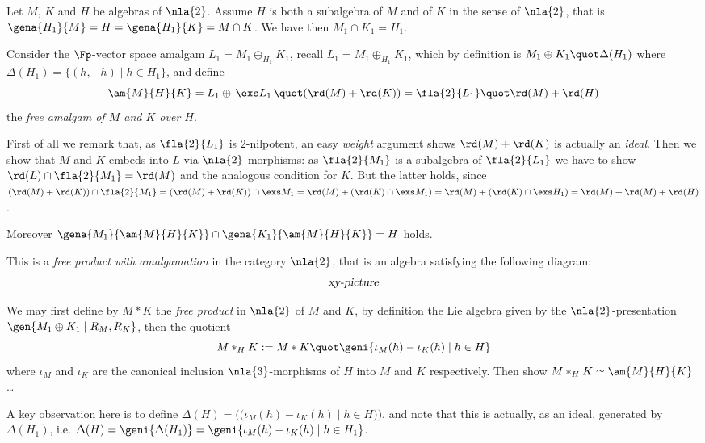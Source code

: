 Let $M$, $K$ and $H$ be algebras of $\nla{2}$.
Assume $H$ is both a subalgebra of $M$ and of $K$  in
the sense of $\nla{2}$, that is $\gena{H_{1}}{M}=H=\gena{H_{1}}{K}=M\cap K$.
We have then %
$M_{1}\cap K_{1}=H_{1}$.

Consider the $\Fp$-vector space amalgam $L_{1}=
M_{1}\oplus_{H_{1}}K_{1}$, recall $L_{1}=M_{1}\oplus_{H_{1}}K_{1}$, which by definition
is $M_{1}\oplus K_{1}\quot\Delta(H_1)$ where $\Delta(H_{1})=\{(h,-h)\mid h\in H_{1}\}$,
and define
$$\am{M}{H}{K}=L_{1}\oplus\,\exs L_{1}\,\quot(\rd(M)+\rd(K))=\fla{2}{L_{1}}\quot\rd(M)+\rd(H)$$
the {\em free amalgam of $M$ and $K$ over $H$}.

First of all we remark that, as $\fla{2}{L_{1}}$ is  $2$-nilpotent, an easy {\em weight} argument shows $\rd(M)+\rd(K)$ is
actually an {\em ideal}. %
Then we show that $M$ and $K$ embeds into $L$ via $\nla{2}$-morphisms: as $\fla{2}{M_{1}}$ is a subalgebra 
of $\fla{2}{L_{1}}$ we have to show $\rd(L)\cap\fla{2}{M_{1}}=\rd(M)$ and the analogous condition for $K$.
But the latter holds, since $(\rd(M)+\rd(K))\cap\fla{2}{M_{1}}=(\rd(M)+\rd(K))\cap\exs M_{1}=\rd(M)+(\rd(K)\cap\exs M_{1})
=\rd(M)+(\rd(K)\cap\exs H_{1})=\rd(M)+\rd(M)+\rd(H)$.

Moreover $\gena{M_{1}}{\am{M}{H}{K}}\cap\gena{K_{1}}{\am{M}{H}{K}}=H$ holds.

\smallskip
This is a {\em free product with amalgamation} in the category $\nla{2}$, that is an algebra
satisfying the following diagram:
$$\textsl{xy-picture}$$

\cbstart %
%
We may first define
by $M \ast K$ the {\em free product} in $\nla{2}$ of $M$ and $K$, by definition the
Lie algebra given by the $\nla{2}$-presentation $\gen{M_{1}\oplus K_{1}\mid R_{M},R_{K}}$, then the quotient
$$M\ast_{H} K:=M\ast K\quot\geni{\iota_{M}(h)-\iota_{K}(h)\mid h\in H}$$
where $\iota_{M}$ and $\iota_{K}$ are the canonical inclusion $\nla{3}$-morphisms of $H$ into $M$ and $K$ respectively.
Then show $M\ast_{H} K\simeq\am{M}{H}{K}$\dots

A key observation here is to define  $\Delta(H)={(\!(}\iota_{M}(h)-\iota_{K}(h)\mid h\in H\mathbf{)\!)}$, and note
that this is actually, as an ideal, generated by $\Delta(H_{1})$, i.{}e. $\Delta(H)=\geni{\Delta(H_{1})}=
\geni{\iota_{M}(h)-\iota_{K}(h)\mid h\in H_{1}}$. \

